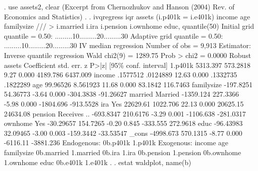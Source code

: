 . use assets2, clear
(Excerpt from Chernozhukov and Hanson (2004) Rev. of Economics and Statistics)
{\smallskip}
. 
. ivqregress iqr assets (i.p401k = i.e401k) income age familysize ///
>         i.married i.ira i.pension i.ownhome educ, quantile(50) 
{\smallskip}
Initial grid
    quantile = 0.50: .........10.........20.........30
{\smallskip}
Adaptive grid
    quantile = 0.50: .........10.........20.........30
{\smallskip}
IV median regression                                   Number of obs =   9,913
Estimator: Inverse quantile regression                 Wald chi2(9)  = 1289.75
                                                       Prob > chi2   =  0.0000
{\smallskip}
             {\VBAR}               Robust
      assets {\VBAR} Coefficient  std. err.      z    P>|z|     [95\% conf. interval]
     1.p401k {\VBAR}   5313.397   573.2818     9.27   0.000     4189.786    6437.009
      income {\VBAR}   .1577512   .0124889    12.63   0.000     .1332735    .1822289
         age {\VBAR}   99.96526   8.561923    11.68   0.000      83.1842    116.7463
  familysize {\VBAR}  -197.8251   54.36773    -3.64   0.000    -304.3838   -91.26627
             {\VBAR}
     married {\VBAR}
    Married  {\VBAR}  -1359.124   227.3366    -5.98   0.000    -1804.696   -913.5528
             {\VBAR}
         ira {\VBAR}
        Yes  {\VBAR}   22629.61   1022.706    22.13   0.000     20625.15    24634.08
             {\VBAR}
     pension {\VBAR}
Receives ..  {\VBAR}  -693.8347   210.6176    -3.29   0.001    -1106.638   -281.0317
             {\VBAR}
     ownhome {\VBAR}
        Yes  {\VBAR}  -30.29657   154.7265    -0.20   0.845     -333.555    272.9618
        educ {\VBAR}  -96.43983   32.09465    -3.00   0.003    -159.3442   -33.53547
       _cons {\VBAR}  -4998.673   570.1315    -8.77   0.000     -6116.11   -3881.236
Endogenous: 0b.p401k 1.p401k
 Exogenous: income age familysize 0b.married 1.married 0b.ira 1.ira
            0b.pension 1.pension 0b.ownhome 1.ownhome educ 0b.e401k 1.e401k
{\smallskip}
. 
. estat waldplot, name(b)

